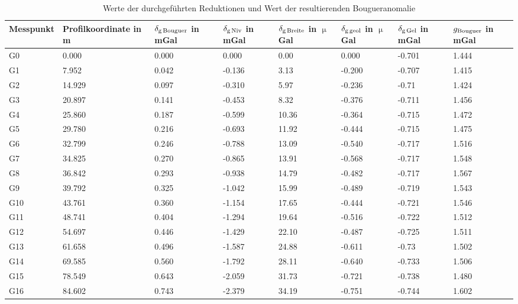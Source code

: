 \begin{landscape}
\begin{table}[!ht]
\centering
\caption{Werte der durchgeführten Reduktionen und Wert der resultierenden Bougueranomalie}
\label{tab:reduktionen}
\begin{tabular}{llllllll}
\toprule
Messpunkt & Profilkoordinate in m & $\delta_{\mathrm{g\,Bouguer}}$ in mGal & $\delta_{\mathrm{g\,Niv}}$ in mGal & $\delta_{\mathrm{g\,Breite}}$ in $\upmu$Gal & $\delta_{\mathrm{g\,geol}}$ in $\upmu$Gal & $\delta_{\mathrm{g\,Gel}}$ in mGal & $g_{\mathrm{Bouguer}}$ in mGal \\
\midrule
G0 & 0.000 & 0.000 & 0.000 & 0.00 & 0.000 & -0.701 & 1.444 \\
G1 & 7.952 & 0.042 & -0.136 & 3.13 & -0.200 & -0.707 & 1.415 \\
G2 & 14.929 & 0.097 & -0.310 & 5.97 & -0.236 & -0.71 & 1.424 \\
G3 & 20.897 & 0.141 & -0.453 & 8.32 & -0.376 & -0.711 & 1.456 \\
G4 & 25.860 & 0.187 & -0.599 & 10.36 & -0.364 & -0.715 & 1.472 \\
G5 & 29.780 & 0.216 & -0.693 & 11.92 & -0.444 & -0.715 & 1.475 \\
G6 & 32.799 & 0.246 & -0.788 & 13.09 & -0.540 & -0.717 & 1.516 \\
G7 & 34.825 & 0.270 & -0.865 & 13.91 & -0.568 & -0.717 & 1.548 \\
G8 & 36.842 & 0.293 & -0.938 & 14.79 & -0.482 & -0.717 & 1.567 \\
G9 & 39.792 & 0.325 & -1.042 & 15.99 & -0.489 & -0.719 & 1.543 \\
G10 & 43.761 & 0.360 & -1.154 & 17.65 & -0.444 & -0.721 & 1.546 \\
G11 & 48.741 & 0.404 & -1.294 & 19.64 & -0.516 & -0.722 & 1.512 \\
G12 & 54.697 & 0.446 & -1.429 & 22.10 & -0.487 & -0.725 & 1.511 \\
G13 & 61.658 & 0.496 & -1.587 & 24.88 & -0.611 & -0.73 & 1.502 \\
G14 & 69.585 & 0.560 & -1.792 & 28.11 & -0.640 & -0.733 & 1.506 \\
G15 & 78.549 & 0.643 & -2.059 & 31.73 & -0.721 & -0.738 & 1.480 \\
G16 & 84.602 & 0.743 & -2.379 & 34.19 & -0.751 & -0.744 & 1.602 \\ \bottomrule
\end{tabular}
\end{table}
\end{landscape}

